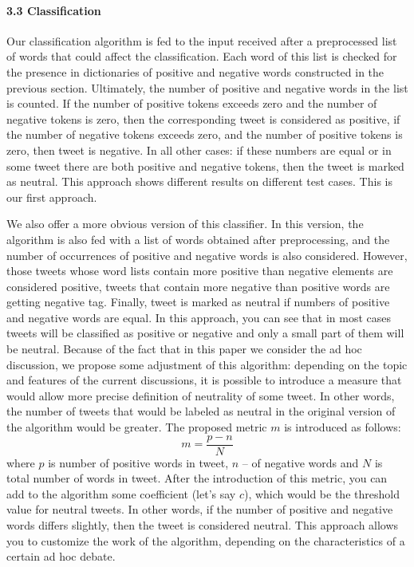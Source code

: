 \paragraph{3.3 Classification}
Our classification algorithm is fed to the input received after a preprocessed list of words that could affect the classification. Each word of this list is checked for the presence in dictionaries of positive and negative words constructed in the previous section. Ultimately, the number of positive and negative words in the list is counted. If the number of positive tokens exceeds zero and the number of negative tokens is zero, then the corresponding tweet is considered as positive, if the number of negative tokens exceeds zero, and the number of positive tokens is zero, then tweet is negative. In all other cases: if these numbers are equal or in some tweet there are both positive and negative tokens, then the tweet is marked as neutral. This approach shows different results on different test cases. This is our first approach.

We also offer a more obvious version of this classifier. In this version, the algorithm is also fed with a list of words obtained after preprocessing, and the number of occurrences of positive and negative words is also considered. However, those tweets whose word lists contain more positive than negative elements are considered positive, tweets that contain more negative than positive words are getting negative tag. Finally, tweet is marked as neutral if numbers of positive and negative words are equal. In this approach, you can see that in most cases tweets will be classified as positive or negative and only a small part of them will be neutral. Because of the fact that in this paper we consider the ad hoc discussion, we propose some adjustment of this algorithm: depending on the topic and features of the current discussions, it is possible to introduce a measure that would allow more precise definition of neutrality of some tweet. In other words, the number of tweets that would be labeled as neutral in the original version of the algorithm would be greater. The proposed metric \(m\) is introduced as follows:
\begin{equation}
	\label{eqn:31}
	m = \frac{p - n}{N}
\end{equation}
where \(p\) is number of positive words in tweet, \(n\) -- of negative words and \(N\) is total number of words in tweet. After the introduction of this metric, you can add to the algorithm some coefficient (let’s say \(c\)), which would be the threshold value for neutral tweets. In other words, if the number of positive and negative words differs slightly, then the tweet is considered neutral. This approach allows you to customize the work of the algorithm, depending on the characteristics of a certain ad hoc debate.

